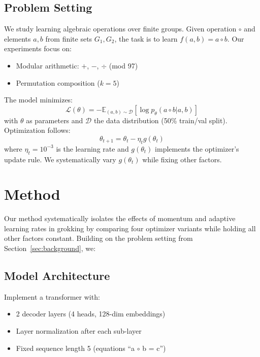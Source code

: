 \documentclass{article} %
\begin{document}
\subsection{Problem Setting}
We study learning algebraic operations over finite groups. Given operation $\circ$ and elements $a,b$ from finite sets $G_1,G_2$, the task is to learn $f(a,b) = a \circ b$. Our experiments focus on:
\begin{itemize}
    \item Modular arithmetic: $+$, $-$, $\div$ (mod 97)
    \item Permutation composition ($k=5$)
\end{itemize}

The model minimizes:
\begin{equation}
    \mathcal{L}(\theta) = -\mathbb{E}_{(a,b)\sim \mathcal{D}}[\log p_\theta(a \circ b|a,b)]
\end{equation}
with $\theta$ as parameters and $\mathcal{D}$ the data distribution (50\% train/val split). Optimization follows:
\begin{equation}
    \theta_{t+1} = \theta_t - \eta_t g(\theta_t)
\end{equation}
where $\eta_t=10^{-3}$ is the learning rate and $g(\theta_t)$ implements the optimizer's update rule. We systematically vary $g(\theta_t)$ while fixing other factors.

\section{Method}
\label{sec:method}

Our method systematically isolates the effects of momentum and adaptive learning rates in grokking by comparing four optimizer variants while holding all other factors constant. Building on the problem setting from Section~\ref{sec:background}, we:

\subsection{Model Architecture}
Implement a transformer \citep{vaswani2017attention} with:
\begin{itemize}
    \item 2 decoder layers (4 heads, 128-dim embeddings)
    \item Layer normalization \citep{ba2016layer} after each sub-layer
    \item Fixed sequence length 5 (equations ``a $\circ$ b = c'')
\end{itemize}
\end{document}
